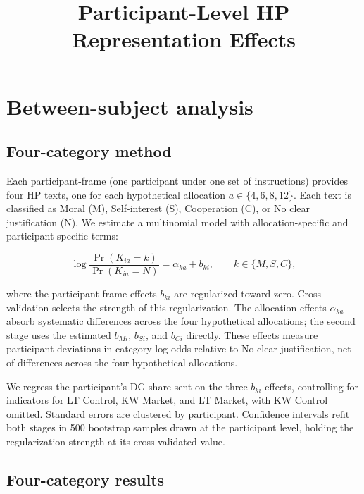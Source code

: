 \documentclass{article}
\title{Participant-Level HP Representation Effects}
\author{}
\date{}
\begin{document}
\maketitle

\section{Between-subject analysis}

\subsection{Four-category method}

Each participant-frame (one participant under one set of instructions) provides four HP texts, one for each hypothetical allocation $a\in\{4,6,8,12\}$. Each text is classified as Moral (M), Self-interest (S), Cooperation (C), or No clear justification (N). We estimate a multinomial model with allocation-specific and participant-specific terms:

\begin{equation}
    \log\frac{\Pr(K_{ia}=k)}{\Pr(K_{ia}=N)}=\alpha_{ka}+b_{ki},
    \qquad k\in\{M,S,C\},
\end{equation}

where the participant-frame effects $b_{ki}$ are regularized toward zero. Cross-validation selects the strength of this regularization. The allocation effects $\alpha_{ka}$ absorb systematic differences across the four hypothetical allocations; the second stage uses the estimated $b_{Mi}$, $b_{Si}$, and $b_{Ci}$ directly. These effects measure participant deviations in category log odds relative to No clear justification, net of differences across the four hypothetical allocations.

We regress the participant's DG share sent on the three $b_{ki}$ effects, controlling for indicators for LT Control, KW Market, and LT Market, with KW Control omitted. Standard errors are clustered by participant. Confidence intervals refit both stages in 500 bootstrap samples drawn at the participant level, holding the regularization strength at its cross-validated value.

\subsection{Four-category results}
\end{document}
